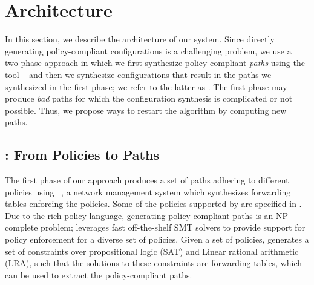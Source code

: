 \section{Architecture} \label{sec:architecture}
In this section, we describe the architecture of our system.  Since
directly generating policy-compliant configurations is a challenging
problem, we use a two-phase approach in which we first synthesize
policy-compliant \emph{paths} using the tool \genesis~\cite{genesis}
and then we synthesize configurations that result in the paths we
synthesized in the first phase; we refer to the latter as \name.
The first phase may produce \emph{bad} paths for which the
configuration synthesis is complicated or not possible. Thus, we
propose ways to restart the algorithm by computing new paths.

\subsection{\genesis: From Policies to Paths} \label{sec:genesis}
The first phase of our approach produces a set of paths adhering to
different policies using \genesis~\cite{genesis}, a network management
system which synthesizes forwarding tables enforcing the policies. 
Some of the policies supported by \genesis are specified in 
. 
Due to the rich policy language, generating policy-compliant paths is an NP-complete problem;
\genesis leverages fast off-the-shelf SMT solvers to provide
support for policy enforcement for a diverse set of policies.
Given a set of policies, \genesis generates a set of constraints 
over propositional logic (SAT) and Linear rational arithmetic (LRA),
such that the solutions to these constraints are forwarding
tables, which can be used to extract the 
policy-compliant paths.

